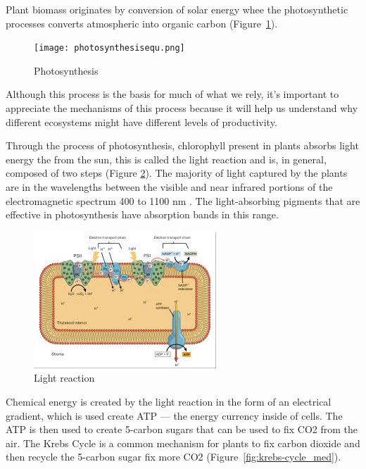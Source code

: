 
Plant biomass originates by conversion of solar energy whee the photosynthetic processes converts atmospheric \CO into organic carbon (Figure~\ref{fig:photosynthesis}).
 
   \begin{figure}[ht]
    \centering
        \texttt{[image: photosynthesisequ.png]}
				\caption{Photosynthesis}
				\label{fig:photosynthesis}
    \end{figure}
		
Although this process is the basis for much of what we rely, it's important to appreciate the mechanisms of this process because it will help us understand why different ecosystems might have different levels of productivity. 

Through the process of \gls{photosynthesis}, chlorophyll present in plants absorbs light energy the from the sun, this is called the light reaction and is, in general, composed of two steps (Figure \ref{fig:light_rxn}). The majority of light captured by the plants are in the wavelengths between the visible and near infrared portions of the electromagnetic spectrum 400 to 1100 nm \citep{stenberg2010visible}. The light-absorbing pigments that are effective in photosynthesis have absorption bands in this range.

\begin{figure}[htb]
	\centering
		\includegraphics{graphics/light_rxn.jpg}
	\caption{Light reaction}
	\label{fig:light_rxn}
\end{figure}

Chemical energy is created by the light reaction in the form of an electrical gradient, which is used create ATP --- the energy currency inside of cells. The ATP is then used to create 5-carbon sugars that can be used to fix CO2 from the air. The Krebs Cycle is a common mechanism for plants to fix carbon dioxide and then recycle the 5-carbon sugar fix more CO2 (Figure~\ref{fig:krebs-cycle_med}). 

